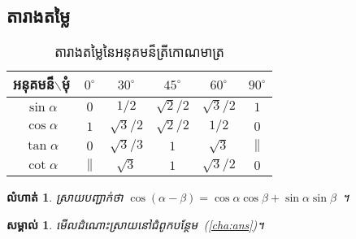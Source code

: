 \documentclass[a4paper,12pt,oneside]{book}
\newtheorem{exercise}{លំហាត់}[chapter]
\newtheorem{remark}{សម្គាល់}[chapter]
\begin{document}
	\subsection{តារាងតម្លៃ}
	\begin{table}[H]
		\centering
		\begin{tabular}{|c|c|c|c|c|c|}
			\hline
			អនុគមន៏$ \backslash $មុំ & $ 0^\circ $ & $ 30^\circ $ & $ 45^\circ $ & $ 60^\circ $ & $ 90^\circ $\\
			\hline
			$ \sin\alpha $ & $ 0 $ & $ 1/2 $ & $ \sqrt{2}/2 $ & $ \sqrt{3}/2 $ & $ 1 $\\
			\hline
			$ \cos\alpha $ & $ 1 $ & $ \sqrt{3}/2 $ & $ \sqrt{2}/2 $ & $ 1/2 $ & $ 0 $\\
			\hline
			$ \tan\alpha $ & $ 0 $ & $ \sqrt{3}/3 $ & $ 1 $ & $ \sqrt{3} $ & $ \parallel $\\
			\hline
			$ \cot\alpha $ & $ \parallel $ & $ \sqrt{3} $ & $ 1 $ & $ \sqrt{3}/2 $ & $ 0 $\\
			\hline
		\end{tabular}
		\caption{តារាងតម្លៃនៃអនុគមន៏ត្រីកោណមាត្រ}
	\end{table}
	\begin{exercise}\label{exe:cos}
		ស្រាយបញ្ជាក់ថា $ \cos(\alpha-\beta)=\cos\alpha\cos\beta+\sin\alpha\sin\beta $~។
	\end{exercise}
	\begin{remark}
		មើលដំណោះស្រាយនៅជំពូកបន្ថែម~(\ref{cha:ans})។
	\end{remark}
	\appendix
\end{document}
